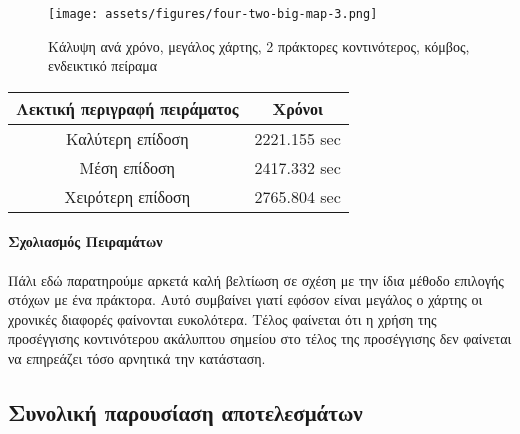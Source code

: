 
\begin{figure}[!h]
	\centering
	\texttt{[image: assets/figures/four-two-big-map-3.png]}
	\caption{Κάλυψη ανά χρόνο, μεγάλος χάρτης, 2 πράκτορες κοντινότερος, κόμβος, ενδεικτικό πείραμα}
\end{figure}

\begingroup
\centering
\begin{tabular}{c | c }
	\textbf{Λεκτική περιγραφή πειράματος} & \textbf{Χρόνοι}\\ \hline{}
	Καλύτερη επίδοση & 2221.155 sec \\ \hline
	Μέση επίδοση & 2417.332 sec   \\ \hline
	Χειρότερη επίδοση & 2765.804 sec \\ 
\end{tabular}
\endgroup

\paragraph{Σχολιασμός Πειραμάτων}

Πάλι εδώ παρατηρούμε αρκετά καλή βελτίωση σε σχέση με την ίδια μέθοδο επιλογής στόχων με ένα πράκτορα. Αυτό συμβαίνει γιατί εφόσον είναι μεγάλος ο χάρτης οι χρονικές διαφορές φαίνονται ευκολότερα. Τέλος φαίνεται ότι η χρήση της προσέγγισης κοντινότερου ακάλυπτου σημείου στο τέλος της προσέγγισης δεν φαίνεται να επηρεάζει τόσο αρνητικά την κατάσταση. 


\subsection{Συνολική παρουσίαση αποτελεσμάτων}

